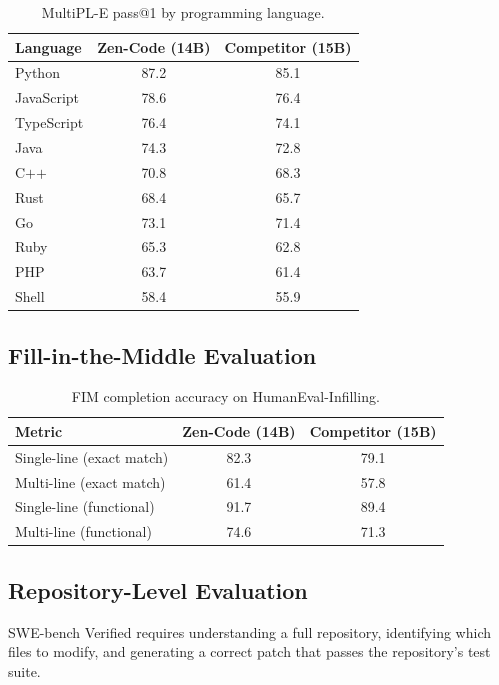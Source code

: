 \documentclass[11pt,a4paper]{article}
\begin{document}
\begin{table}[H]
\centering
\caption{MultiPL-E pass@1 by programming language.}
\label{tab:multilingual_code}
\begin{tabular}{lcc}
\toprule
\textbf{Language} & \textbf{Zen-Code (14B)} & \textbf{Competitor (15B)} \\
\midrule
Python      & 87.2 & 85.1 \\
JavaScript  & 78.6 & 76.4 \\
TypeScript  & 76.4 & 74.1 \\
Java        & 74.3 & 72.8 \\
C$+$$+$     & 70.8 & 68.3 \\
Rust        & 68.4 & 65.7 \\
Go          & 73.1 & 71.4 \\
Ruby        & 65.3 & 62.8 \\
PHP         & 63.7 & 61.4 \\
Shell       & 58.4 & 55.9 \\
\bottomrule
\end{tabular}
\end{table}

\subsection{Fill-in-the-Middle Evaluation}

\begin{table}[H]
\centering
\caption{FIM completion accuracy on HumanEval-Infilling.}
\label{tab:fim}
\begin{tabular}{lcc}
\toprule
\textbf{Metric} & \textbf{Zen-Code (14B)} & \textbf{Competitor (15B)} \\
\midrule
Single-line (exact match) & 82.3 & 79.1 \\
Multi-line (exact match)  & 61.4 & 57.8 \\
Single-line (functional)  & 91.7 & 89.4 \\
Multi-line (functional)   & 74.6 & 71.3 \\
\bottomrule
\end{tabular}
\end{table}

\subsection{Repository-Level Evaluation}

SWE-bench Verified requires understanding a full repository, identifying which files to
modify, and generating a correct patch that passes the repository's test suite.
\end{document}
